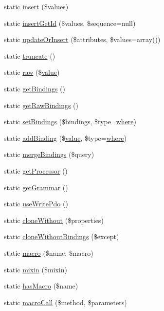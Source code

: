 \begin{DoxyCompactItemize}
\item 
static \mbox{\hyperlink{class_eloquent_af7d0fbced37746ae8bd902ef5f68a7ae}{insert}} (\$values)
\item 
static \mbox{\hyperlink{class_eloquent_a1844f44a1ce5e328d145034b7536e2ea}{insert\+Get\+Id}} (\$values, \$sequence=null)
\item 
static \mbox{\hyperlink{class_eloquent_a9000a3ec879c46fbd69d07e9818da617}{update\+Or\+Insert}} (\$attributes, \$values=array())
\item 
static \mbox{\hyperlink{class_eloquent_a96ac4ef3c15f8420f7517ef3a5c75b8c}{truncate}} ()
\item 
static \mbox{\hyperlink{class_eloquent_a526a8894771e444ed5aa81987eecd3cf}{raw}} (\$\mbox{\hyperlink{class_eloquent_a653061eb837042f61e82447886e15a72}{value}})
\item 
static \mbox{\hyperlink{class_eloquent_a2354a3b999001c7332d956e5cc2fcf07}{get\+Bindings}} ()
\item 
static \mbox{\hyperlink{class_eloquent_a0e2f203149983e1293a215f5d010e014}{get\+Raw\+Bindings}} ()
\item 
static \mbox{\hyperlink{class_eloquent_a3ce121762513ed5de49b13594887f51c}{set\+Bindings}} (\$bindings, \$type=\textquotesingle{}\mbox{\hyperlink{class_eloquent_a73746da2a8ac07c59c577acde0606d5d}{where}}\textquotesingle{})
\item 
static \mbox{\hyperlink{class_eloquent_ab657124a93444b0a941f40d943bac574}{add\+Binding}} (\$\mbox{\hyperlink{class_eloquent_a653061eb837042f61e82447886e15a72}{value}}, \$type=\textquotesingle{}\mbox{\hyperlink{class_eloquent_a73746da2a8ac07c59c577acde0606d5d}{where}}\textquotesingle{})
\item 
static \mbox{\hyperlink{class_eloquent_a590622affbe9e982b13019733af32012}{merge\+Bindings}} (\$query)
\item 
static \mbox{\hyperlink{class_eloquent_af06482fd0045347d96e02da15e1bcd2c}{get\+Processor}} ()
\item 
static \mbox{\hyperlink{class_eloquent_ad1d4b842e0773138ab7660b968cc180b}{get\+Grammar}} ()
\item 
static \mbox{\hyperlink{class_eloquent_a8e99b1a02f0cb83410036aea50c23b24}{use\+Write\+Pdo}} ()
\item 
static \mbox{\hyperlink{class_eloquent_acbd1833f18473cd1dd4fb755460592f3}{clone\+Without}} (\$properties)
\item 
static \mbox{\hyperlink{class_eloquent_a3794141227f450194be39fe46372cfa3}{clone\+Without\+Bindings}} (\$except)
\item 
static \mbox{\hyperlink{class_eloquent_a8839c902460bd7744993f61693711cf7}{macro}} (\$name, \$macro)
\item 
static \mbox{\hyperlink{class_eloquent_a59e9f5c02a0686de57f66eeb0230df58}{mixin}} (\$mixin)
\item 
static \mbox{\hyperlink{class_eloquent_a02e81dba5c768e3cb30a0394d697582a}{has\+Macro}} (\$name)
\item 
static \mbox{\hyperlink{class_eloquent_a6afe5c89170eab3d8de7693f741accfa}{macro\+Call}} (\$method, \$parameters)
\end{DoxyCompactItemize}


